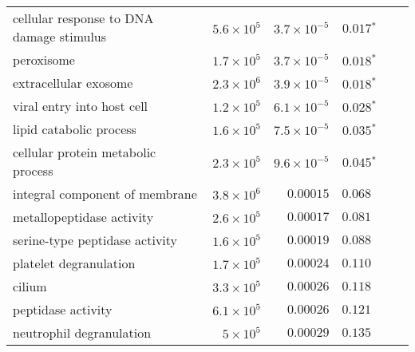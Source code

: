 \begin{longtable*}{|l|r|r|r|r|r|}
    cellular response to DNA damage stimulus            & $5.6\times 10^{5}$ & $3.7\times 10^{-5}$  & $\bm{ 0.017{^*}}$                                        \\
    peroxisome                                          & $1.7\times 10^{5}$ & $3.7\times 10^{-5}$  & $\bm{ 0.018{^*}}$                                        \\
    extracellular exosome                               & $2.3\times 10^{6}$ & $3.9\times 10^{-5}$  & $\bm{ 0.018{^*}}$                                        \\
    viral entry into host cell                          & $1.2\times 10^{5}$ & $6.1\times 10^{-5}$  & $\bm{ 0.028{^*}}$                                        \\
    lipid catabolic process                             & $1.6\times 10^{5}$ & $7.5\times 10^{-5}$  & $\bm{ 0.035{^*}}$                                        \\
    cellular protein metabolic process                  & $2.3\times 10^{5}$ & $9.6\times 10^{-5}$  & $\bm{ 0.045{^*}}$                                        \\
    integral component of membrane                      & $3.8\times 10^{6}$ & $0.00015$            & $ 0.068~~$                                               \\
    metallopeptidase activity                           & $2.6\times 10^{5}$ & $0.00017$            & $ 0.081~~$                                               \\
    serine-type peptidase activity                      & $1.6\times 10^{5}$ & $0.00019$            & $ 0.088~~$                                               \\
    platelet degranulation                              & $1.7\times 10^{5}$ & $0.00024$            & $ 0.110~~$                                               \\
    cilium                                              & $3.3\times 10^{5}$ & $0.00026$            & $ 0.118~~$                                               \\
    peptidase activity                                  & $6.1\times 10^{5}$ & $0.00026$            & $ 0.121~~$                                               \\
    neutrophil degranulation                            & $ 5\times 10^{5}$  & $0.00029$            & $ 0.135~~$                                               \\

\end{longtable*}
